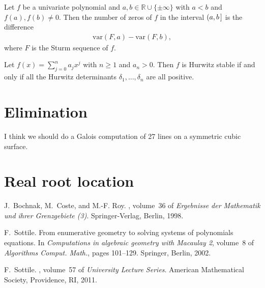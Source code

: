 \documentclass[12pt]{amsart}
\theoremstyle{definition}
\begin{document}
Let $f$ be a univariate polynomial and $a,b\in \mathbb{R}\cup\{\pm\infty\}$ with $a<b$ and $f(a),f(b)\neq 0$. Then the number of zeros of $f$ in the interval $(a,b\hspace{.05cm}]$ is the difference 
\begin{align*}
\text{var}(F,a) - \text{var}(F,b),
\end{align*}
where $F$ is the Sturm sequence of $f$.



\theorem
Let $f(x) = \sum_{j=0}^{n}a_{j}x^{j}$ with $n\geq 1$ and $a_{n}>0$. Then $f$ is Hurwitz stable if and only if all the Hurwitz determinants $\delta_{1},\dots,\delta_{n}$ are all positive.
%
%

\section{Elimination}
%

I think we should do a Galois computation of 27 lines on a symmetric cubic surface.


\section{Real root location}
%




\begin{thebibliography}{1}

J.~Bochnak, M.~Coste, and M.-F. Roy.
, volume~36 of {\em Ergebnisse der
  Mathematik und ihrer Grenzgebiete (3)}.
\newblock Springer-Verlag, Berlin, 1998.

F.~Sottile.
\newblock From enumerative geometry to solving systems of polynomials
  equations.
\newblock In {\em Computations in algebraic geometry with {M}acaulay 2},
  volume~8 of {\em Algorithms Comput. Math.}, pages 101--129. Springer, Berlin,
  2002.

F.~Sottile.
, volume~57 of {\em
  University Lecture Series}.
\newblock American Mathematical Society, Providence, RI, 2011.

\end{thebibliography}
\end{document}
